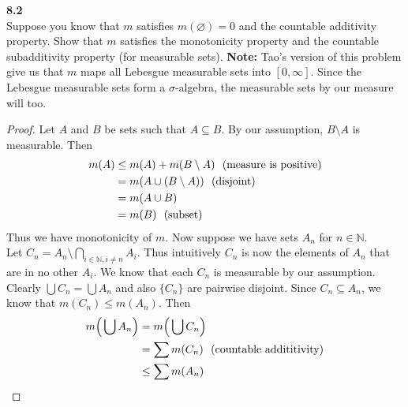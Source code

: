 \documentclass[12pt]{article}
\newcommand{\problem}[1]{\hspace{-4 ex} \large \textbf{#1}\\}
\let\emptyset\varnothing
\begin{document}
\problem{8.2} Suppose you know that $m$ satisfies $m(\emptyset)=0$ and the countable additivity property. Show that $m$ satisfies the monotonicity property and the countable subadditivity property (for measurable sets). \textbf{Note:} Tao's version of this problem give us that $m$ maps all Lebesgue measurable sets into $[0,\infty]$. Since the Lebesgue measurable sets form a $\sigma$-algebra, the measurable sets by our measure will too.

	\begin{proof}
		Let $A$ and $B$ be sets such that $A \subseteq B$. By our assumption, $B \setminus A$ is measurable. Then
		\begin{align*}
			m(A) & \leq m(A) + m(B \setminus A) \text{\space \space (measure is positive)}\\
			& = m(A \cup (B \setminus A)) \text{\space \space (disjoint)}\\
			& = m(A \cup B) \\
			& = m(B) \text{\space \space (subset)}
		\end{align*}
		Thus we have monotonicity of $m$. \bigbreak
		Now suppose we have sets $A_n$ for $n \in \mathbb{N}$. \\
		Let $C_n = A_n \setminus \bigcap\limits_{i \in \mathbb{N}, i \neq n}A_i$. Thus intuitively $C_n$ is now the elements of $A_n$ that are in no other $A_i$. We know that each $C_n$ is measurable by our assumption. Clearly $\bigcup C_n = \bigcup A_n$ and also $\{C_n\}$ are pairwise disjoint. Since $C_n \subseteq A_n$, we know that $m(C_n) \leq m(A_n)$. Then 
		\begin{align*}
			m \Big (\bigcup A_n \Big) & = m \Big( \bigcup C_n \Big) \\
			& = \sum m(C_n) \text{\space \space (countable addititivity)} \\
			& \leq \sum m(A_n)			
		\end{align*}
	\end{proof}
\end{document}
